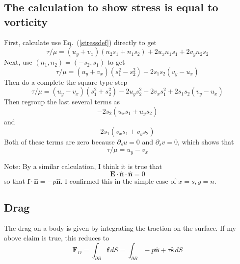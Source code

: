 \documentclass[11pt]{article}
\newcommand{\vsp}[1]{\vspace{#1 pc} \noindent}
\newcommand{\pdi}[2] { {\partial_#2} #1 }
\newcommand{\bvec}[1]{\ensuremath{\boldsymbol{#1}}}
\newcommand{\nhat}{\hat{\bvec{n}}}
\newcommand{\shat}{\hat{\bvec{s}}}
\newcommand {\bdry} {\partial B}
\begin{document}
\subsection{The calculation to show stress is equal to vorticity}
First, calculate use Eq.~(\ref{stressdef}) directly to get
\begin{equation}
\tau/\mu = (u_y+v_x) (n_2 s_1 + n_1 s_2 ) + 2 u_x n_1 s_1 + 2 v_y n_2 s_2
\end{equation}
Next, use $(n_1,n_2) = (-s_2,s_1)$ to get
\begin{equation}
\tau/\mu = (u_y+v_x) (s_1^2 - s_2^2) + 2s_1 s_2 (v_y - u_x)
\end{equation}
Then do a complete the square type step
\begin{equation}
\tau/\mu = (u_y - v_x) (s_1^2 + s_2^2) - 2 u_y s_2^2 + 2v_x s_1^2 + 2s_1 s_2 (v_y - u_x)
\end{equation}
Then regroup the last several terms as
\begin{equation}
-2 s_2 ( u_x s_1 + u_y s_2 )
\end{equation}
and
\begin{equation}
2 s_1 ( v_x s_1 + v_y s_2)
\end{equation}
Both of these terms are zero because $\pdi{u}{s} = 0$ and $\pdi{v}{s} = 0$, which shows that
\begin{equation}
\tau/\mu = u_y - v_x
\end{equation}

\vsp{1}
Note: By a similar calculation, I think it is true that
\begin{equation}
\bvec{E} \cdot \nhat \cdot \nhat = 0
\end{equation}
so that $\bvec{f} \cdot \nhat = -p \nhat$. I confirmed this in the simple case of $x=s, y=n$.

\subsection{Drag}
The drag on a body is given by integrating the traction on the surface. If my above claim is true, this reduces to
\begin{equation}
\bvec{F}_D = \int_{\bdry} \bvec{f} \, dS = \int_{\bdry} -p \nhat + \tau \shat \, dS
\end{equation}
\end{document}
